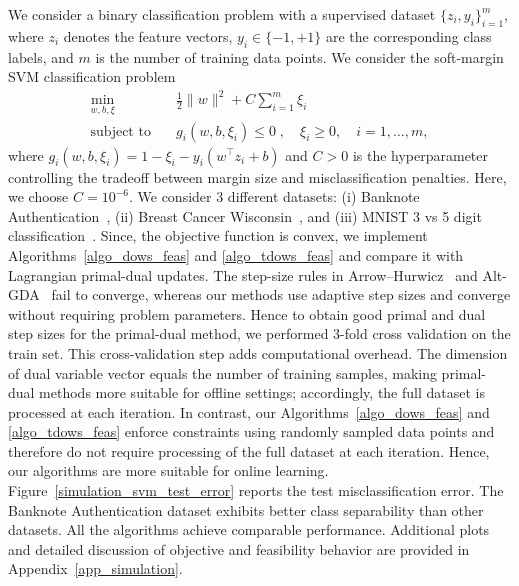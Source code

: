 \documentclass{article}
\theoremstyle{plain}
\theoremstyle{definition}
\theoremstyle{remark}
\begin{document}
We consider a binary classification problem with a supervised dataset $\{z_i, y_i\}_{i=1}^m$, where $z_i$ denotes the feature vectors, $y_i \in \{-1, +1\}$ are the corresponding class labels, and $m$ is the number of training data points. We consider the soft-margin SVM classification problem
\begin{align*}
    \min_{w, b, \xi} \quad & \frac{1}{2}\|w\|^2 + C \sum_{i=1}^m \xi_i \\
    \text{subject to} \quad 
    & g_i(w,b,\xi_i) \leq 0 \;, \quad \xi_i \ge 0,\quad i = 1, \ldots, m ,
\end{align*}
where $g_i(w,b,\xi_i) = 1 - \xi_i - y_i (w^\top z_i + b)$ and $C>0$ is the hyperparameter controlling the tradeoff between margin size and misclassification penalties. Here, we choose $C = 10^{-6}$. We consider 3 different datasets: (i) Banknote Authentication~\cite{banknote_authentication_267}, (ii) Breast Cancer Wisconsin~\cite{breast_cancer_wisconsin_diagnostic_1993}, and (iii) MNIST 3 vs 5 digit classification~\cite{lecun2010mnist}. Since, the objective function is convex, we implement Algorithms~\ref{algo_dows_feas} and \ref{algo_tdows_feas} and compare it with Lagrangian primal-dual updates. The step-size rules in Arrow–Hurwicz~\cite{he2022convergence} and Alt-GDA~\cite{zhang2022near} fail to converge, whereas our methods use adaptive step sizes and converge without requiring problem parameters. Hence to obtain good primal and dual step sizes for the primal-dual method, we performed 3-fold cross validation on the train set. This cross-validation step adds computational overhead. The dimension of dual variable vector equals the number of training samples, making primal-dual methods more suitable for offline settings; accordingly, the full dataset is processed at each iteration. In contrast, our Algorithms~\ref{algo_dows_feas} and \ref{algo_tdows_feas} enforce constraints using randomly sampled data points and therefore do not require processing of the full dataset at each iteration. Hence, our algorithms are more suitable for online learning. Figure~\ref{simulation_svm_test_error} reports the test misclassification error. The Banknote Authentication dataset exhibits better class separability than other datasets. All the algorithms achieve comparable performance. Additional plots and detailed discussion of objective and feasibility behavior are provided in Appendix~\ref{app_simulation}.

\end{document}
